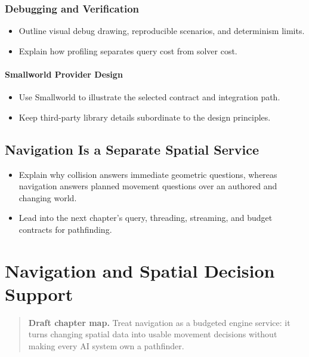 \documentclass[
  11pt,
  letterpaper,
  DIV=11,
  numbers=noendperiod,
  twoside,
  open=right]{scrreprt}
\providecommand{\tightlist}{%
  \setlength{\itemsep}{0pt}\setlength{\parskip}{0pt}}
\begin{document}
\subsection{Debugging and
Verification}\label{debugging-and-verification}

\begin{itemize}
\tightlist
\item
  Outline visual debug drawing, reproducible scenarios, and determinism
  limits.
\item
  Explain how profiling separates query cost from solver cost.
\end{itemize}

\subsubsection{Smallworld Provider
Design}\label{smallworld-provider-design}

\begin{itemize}
\tightlist
\item
  Use Smallworld to illustrate the selected contract and integration
  path.
\item
  Keep third-party library details subordinate to the design principles.
\end{itemize}

\section{Navigation Is a Separate Spatial
Service}\label{navigation-is-a-separate-spatial-service}

\begin{itemize}
\tightlist
\item
  Explain why collision answers immediate geometric questions, whereas
  navigation answers planned movement questions over an authored and
  changing world.
\item
  Lead into the next chapter's query, threading, streaming, and budget
  contracts for pathfinding.
\end{itemize}

\chapter{Navigation and Spatial Decision
Support}\label{navigation-and-spatial-decision-support}

\begin{quote}
\textbf{Draft chapter map.} Treat navigation as a budgeted engine
service: it turns changing spatial data into usable movement decisions
without making every AI system own a pathfinder.
\end{quote}
\end{document}
